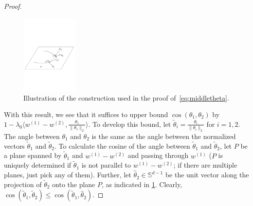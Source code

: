 \documentclass[english]{article}
\newcommand{\bS}{\mathbb{S}}
\newcommand{\inpro}[2]{\langle #1, #2\rangle}
\newcommand{\ttheta}{\tilde{\theta}}
\newcommand{\htheta}{\hat{\theta}}
\newcommand{\inangle}[2]{(#1,#2)}
\begin{document}
\begin{proof}
\begin{figure}[h]
  \centering
	\includegraphics[height=4cm]{figures/GaussmapPro}
  \caption{Illustration of the construction used in the proof of~\eqref{eq:middletheta}.} 
  \label{fig:cuttingplane}
\end{figure}
\fi

With this result, we see that it suffices to upper bound $\cos \inangle{\theta_1}{\theta_2}$ by $1-\lambda_0 \inpro{w^{(1)}-w^{(2)}}{\frac{\theta_1}{\|\theta_1\|_2}}$.
To develop this bound, let $\ttheta_i = \frac{\theta_i}{\|\theta_i\|_2}$ for $i=1,2$.
The angle between $\theta_1$ and $\theta_2$ is the same as the angle between 
the normalized vectors $\ttheta_1$ and $\ttheta_2$.
To calculate the cosine of the angle between $\ttheta_1$ and $\ttheta_2$,
let $P$ be a plane spanned by $\ttheta_1$ and $w^{(1)}-w^{(2)}$ and passing through $w^{(1)}$
($P$ is uniquely determined if $\ttheta_1$ is not parallel to $w^{(1)}-w^{(2)}$;
if there are multiple planes, just pick any of them). 
Further, let $\htheta_2\in \bS^{d-1}$ be the unit vector along the projection of $\ttheta_2$ onto the plane $P$, as indicated in \cref{fig:cuttingplane}.
Clearly, $\cos \inangle{\ttheta_1}{\ttheta_2} \le \cos \inangle{\ttheta_1}{\htheta_2}$.



\end{proof}
\end{document}
